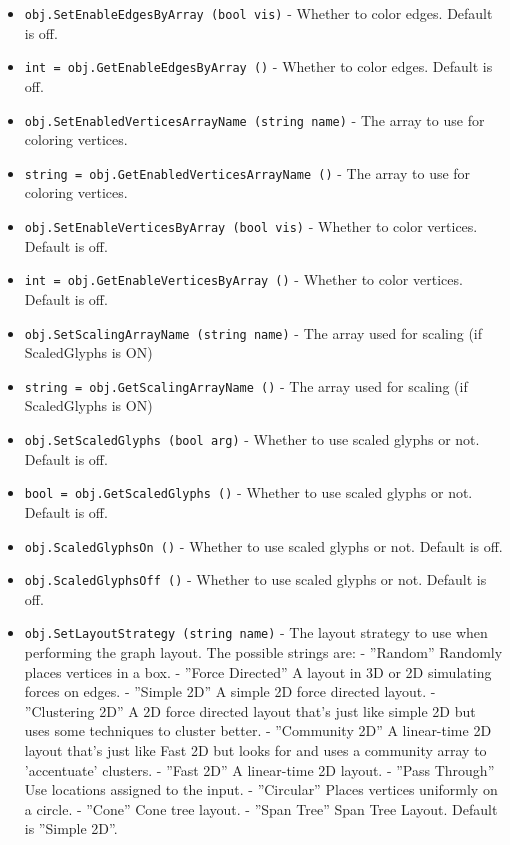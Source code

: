 \begin{itemize}
\item  \verb|obj.SetEnableEdgesByArray (bool vis)| -  Whether to color edges.  Default is off.

\item  \verb|int = obj.GetEnableEdgesByArray ()| -  Whether to color edges.  Default is off.

\item  \verb|obj.SetEnabledVerticesArrayName (string name)| -  The array to use for coloring vertices. 

\item  \verb|string = obj.GetEnabledVerticesArrayName ()| -  The array to use for coloring vertices. 

\item  \verb|obj.SetEnableVerticesByArray (bool vis)| -  Whether to color vertices.  Default is off.

\item  \verb|int = obj.GetEnableVerticesByArray ()| -  Whether to color vertices.  Default is off.

\item  \verb|obj.SetScalingArrayName (string name)| -  The array used for scaling (if ScaledGlyphs is ON)

\item  \verb|string = obj.GetScalingArrayName ()| -  The array used for scaling (if ScaledGlyphs is ON)

\item  \verb|obj.SetScaledGlyphs (bool arg)| -  Whether to use scaled glyphs or not.  Default is off.

\item  \verb|bool = obj.GetScaledGlyphs ()| -  Whether to use scaled glyphs or not.  Default is off.

\item  \verb|obj.ScaledGlyphsOn ()| -  Whether to use scaled glyphs or not.  Default is off.

\item  \verb|obj.ScaledGlyphsOff ()| -  Whether to use scaled glyphs or not.  Default is off.

\item  \verb|obj.SetLayoutStrategy (string name)| -  The layout strategy to use when performing the graph layout.
 The possible strings are:
  - ''Random''         Randomly places vertices in a box.
  - ''Force Directed'' A layout in 3D or 2D simulating forces on edges.
  - ''Simple 2D''      A simple 2D force directed layout.
  - ''Clustering 2D''  A 2D force directed layout that's just like
                     simple 2D but uses some techniques to cluster better.
  - ''Community 2D''   A linear-time 2D layout that's just like
                    Fast 2D but looks for and uses a community 
                    array to 'accentuate' clusters.
  - ''Fast 2D''       A linear-time 2D layout.
  - ''Pass Through''  Use locations assigned to the input.
  - ''Circular''      Places vertices uniformly on a circle.
  - ''Cone''          Cone tree layout.
  - ''Span Tree''     Span Tree Layout.
 Default is ''Simple 2D''.


\end{itemize}
